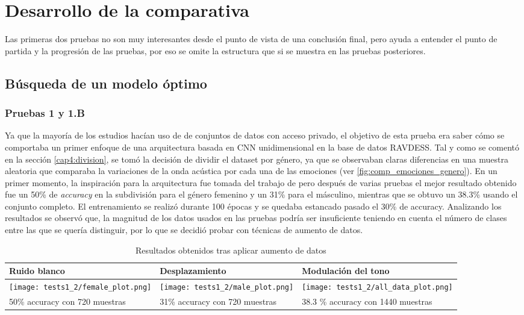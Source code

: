 \documentclass[11pt,a4paper,spanish]{book}
\begin{document}
	\chapter{Desarrollo de la comparativa}
	Las primeras dos pruebas no son muy interesantes desde el punto de vista de una conclusión final, pero ayuda a entender el punto de partida y la progresión de las pruebas, por eso se omite la estructura que si se muestra en las pruebas posteriores.
	\section{Búsqueda de un  modelo óptimo}
	\label{cap:4ModeloOptimo}
		\subsection{Pruebas 1 y 1.B}
		Ya que la mayoría de los estudios hacían uso de de conjuntos de datos con acceso privado, el objetivo de esta prueba era saber cómo se comportaba un primer enfoque de una arquitectura basada en CNN unidimensional en la base de datos RAVDESS. Tal y como se comentó en la sección \ref{cap4:division}, se tomó la decisión de dividir el dataset por género, ya que se observaban claras diferencias en una muestra aleatoria que comparaba la variaciones de la onda acústica por cada una de las emociones (ver \ref{fig:comp_emociones_genero}). En un primer momento, la inspiración para la arquitectura fue tomada del trabajo de \cite{blabla} pero después de varias pruebas el mejor resultado obtenido fue un 50\% de \emph{accuracy} en la subdivisión para el género femenino y un 31\% para el másculino, mientras que se obtuvo un 38.3\% usando el conjunto completo. El entrenamiento se realizó durante 100 épocas y se quedaba estancado pasado el 30\% de accuracy. Analizando los resultados se observó que, la magnitud de los datos usados en las pruebas podría ser insuficiente teniendo en cuenta el número de clases entre las que se quería distinguir, por lo que se decidió probar con técnicas de aumento de datos.
	
	
	\begin{table}[H]
		\centering
		\begin{center}
			\begin{tabular}{|p{4.75cm} |p{4.75cm} |p{4.75cm}|}
				\hline
				Ruido blanco & Desplazamiento & Modulación del tono \\ 
				\hline
				\texttt{[image: tests1\_2/female\_plot.png]} & \texttt{[image: tests1\_2/male\_plot.png]} & \texttt{[image: tests1\_2/all\_data\_plot.png]}\\
				\hline
				50\% accuracy con 720 muestras & 31\%  accuracy con 720 muestras & 38.3 \% accuracy con 1440 muestras \\
				\hline	
			\end{tabular}
			\caption{Resultados obtenidos tras aplicar aumento de datos}
			\label{cap5:genderplots}
		\end{center}
	\end{table}
	
\end{document}
